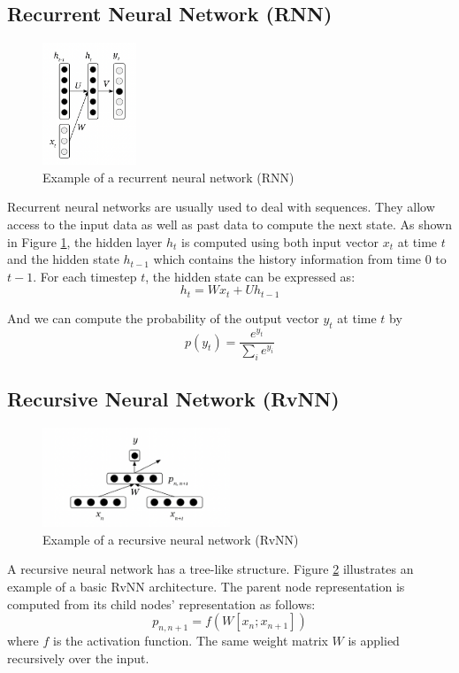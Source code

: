 \documentclass[12pt,a4paper,twoside]{report}
\begin{document}
\subsection{Recurrent Neural Network (RNN)}
\begin{figure}[ht]
\centering
\includegraphics[width=0.25\textwidth]{images/rnn.png}
\caption{Example of a recurrent neural network (RNN)}
\label{fig:rnn}
\end{figure}
Recurrent neural networks are usually used to deal with sequences. They allow access to the input data as well as past data to compute the next state. As shown in Figure \ref{fig:rnn}, the hidden layer $h_t$ is computed using both input vector $x_t$ at time $t$ and the hidden state $h_{t-1}$ which contains the history information from time 0 to $t-1$. For each timestep $t$, the hidden state can be expressed as:
\[ h_t = Wx_t + Uh_{t-1} \]

And we can compute the probability of the output vector $y_t$ at time $t$ by
\[ p(y_t) = \frac{e^{y_t}}{\sum_{i}e^{y_i}}\]

\subsection{Recursive Neural Network (RvNN)}
\begin{figure}[ht]
\centering
\includegraphics[width=0.5\textwidth]{images/rvnn.png}
\caption{Example of a recursive neural network (RvNN)}
\label{fig:rvnn}
\end{figure}
A recursive neural network has a tree-like structure. Figure \ref{fig:rvnn} illustrates an example of a basic RvNN architecture. The parent node representation is computed from its child nodes' representation as follows:
\[ p_{n, n+1} = f(W[x_n; x_{n+1}]) \]
where $f$ is the activation function. The same weight matrix $W$ is applied recursively over the input.
\end{document}
